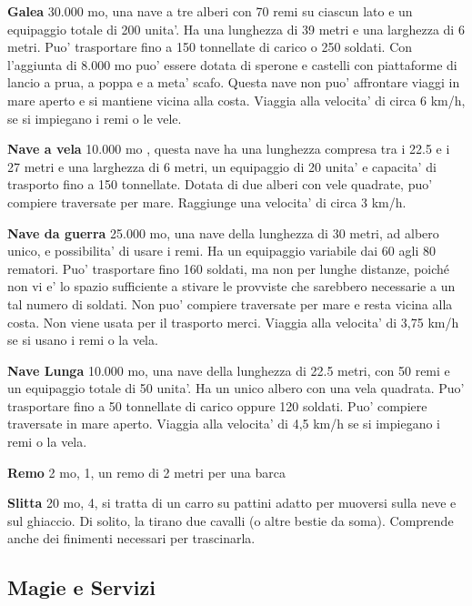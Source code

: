 \documentclass[a4paper,11pt,twoside,openany]{book}
\begin{document}
{		\textbf{Galea} 30.000 mo, una nave a tre alberi con 70 remi su ciascun lato e un equipaggio totale di 200 unita'. Ha una lunghezza di 39 metri e una larghezza di 6 metri.
		Puo' trasportare fino a 150 tonnellate di carico o 250 soldati. Con l'aggiunta di 8.000 mo puo' essere dotata di sperone e castelli con piattaforme di lancio a prua, a poppa e a meta' scafo. Questa nave non puo' affrontare viaggi in mare aperto e si mantiene vicina alla costa.
		Viaggia alla velocita' di circa 6 km/h, se si impiegano i remi o le vele.
		
		\textbf{Nave a vela} 10.000 mo , questa nave ha una lunghezza compresa tra i 22.5 e i 27 metri e una larghezza di 6 metri, un equipaggio di 20 unita' e capacita' di trasporto fino a 150 tonnellate. Dotata di due alberi con vele quadrate, puo' compiere traversate per mare. Raggiunge una velocita' di circa 3 km/h. 
		
		\textbf{Nave da guerra} 25.000 mo, una nave della lunghezza di 30 metri, ad albero unico, e possibilita' di usare i remi. Ha un equipaggio variabile dai 60 agli 80 rematori. Puo' trasportare fino 160 soldati, ma non per lunghe distanze, poiché non vi e' lo spazio sufficiente a stivare le provviste che sarebbero necessarie a un tal numero di soldati. Non puo' compiere traversate per mare e resta vicina alla costa. Non viene usata per il trasporto merci. Viaggia alla velocita' di 3,75 km/h se si usano i remi o la vela.
		
		\textbf{Nave Lunga} 10.000 mo, una nave della lunghezza di 22.5 metri, con 50 remi e un equipaggio totale di 50 unita'. Ha un unico albero con una vela quadrata. Puo' trasportare fino a 50 tonnellate di carico oppure 120 soldati. Puo' compiere traversate in mare aperto. Viaggia alla velocita' di 4,5 km/h se si impiegano i remi o la vela.
		
		\textbf{Remo} 2 mo, 1, un remo di 2 metri per una barca
		
		\textbf{Slitta} 20 mo, 4, si tratta di un carro su pattini adatto per muoversi sulla neve e sul ghiaccio. Di solito, la tirano due cavalli (o altre bestie da soma). Comprende anche dei finimenti necessari per trascinarla.
		
		\pagebreak
		
		\subsection{Magie e Servizi}
		
		\label{magie-e-servizi}
		
}
\end{document}
